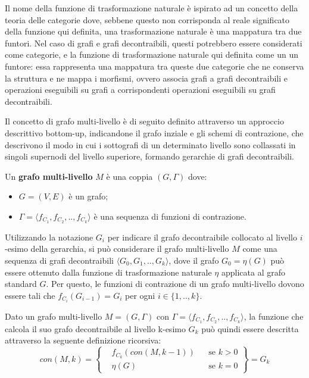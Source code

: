 Il nome della funzione di trasformazione naturale è ispirato ad un concetto della teoria delle categorie dove,
sebbene questo non corrisponda al reale significato della funzione qui definita, una trasformazione naturale è una
mappatura tra due funtori.
Nel caso di grafi e grafi decontraibili, questi potrebbero essere considerati come categorie, e la funzione di
trasformazione naturale qui definita come un un funtore: essa rappresenta una mappatura tra queste due categorie
che ne conserva la struttura e ne mappa i morfismi, ovvero associa grafi a grafi decontraibili e operazioni eseguibili
su grafi a corrispondenti operazioni eseguibili su grafi decontraibili.

\label{subsec:definzione-grafi_multilivello}

Il concetto di grafo multi-livello \`e di seguito definito attraverso un approccio descrittivo bottom-up,
indicandone il grafo inziale e gli schemi di contrazione, che descrivono il modo in cui i sottografi di un
determinato livello sono collassati in singoli supernodi del livello superiore, formando gerarchie di grafi
decontraibili.

\begin{definition}
Un \textbf{grafo multi-livello} $M$ \`e una coppia $(G, \Gamma)$ dove:
    \begin{itemize}
        \item $G = (V, E)$ \`e un grafo;
        \item $\Gamma = \langle f_{C_1}, f_{C_2}, .., f_{C_k} \rangle$ \`e una sequenza di funzioni di contrazione.
    \end{itemize}
\end{definition}

Utilizzando la notazione $G_i$ per indicare il grafo decontraibile collocato al livello $i$-esimo della gerarchia,
si pu\`o considerare il grafo multi-livello $M$ come una sequenza di grafi decontraibili
$\langle G_0, G_1, .., G_k \rangle$, dove il grafo $G_0 = \eta(G)$ pu\`o essere ottenuto dalla funzione di
trasformazione naturale $\eta$ applicata al grafo standard $G$.
Per questo, le funzioni di contrazione di un grafo multi-livello dovono essere tali che
$f_{C_i}(G_{i-1}) = G_i$ per ogni $i \in \{1, .., k\}$. \newline

Dato un grafo multi-livello $M = (G,\Gamma)$ con $\Gamma = \langle f_{C_1}, f_{C_2}, .., f_{C_k} \rangle$,
la funzione che calcola il suo grafo decontraibile al livello k-esimo $G_k$ pu\`o quindi essere descritta
attraverso la seguente definizione ricorsiva: \newline
\begin{equation*}
    con(M, k) =
    \left\{
    \begin{aligned}
        &f_{C_k}(con(M, k-1)) && \text{se } k > 0\\
        &\eta(G)  && \text{se } k = 0
    \end{aligned}
    \right\}
    = G_k
\end{equation*} \newline

